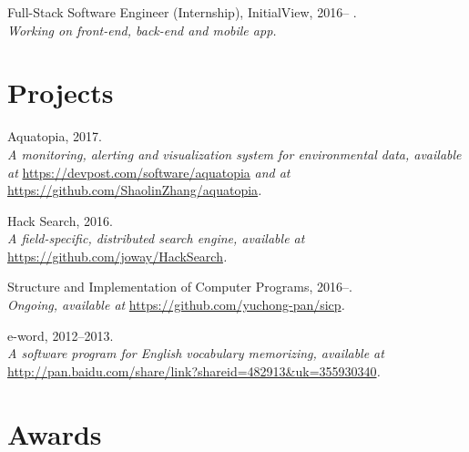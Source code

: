 \documentclass[letterpaper]{article}
\renewenvironment{itemize}{
  \begin{list}{}{
    \setlength{\leftmargin}{1.5em}
  }
}{
  \end{list}
}
\begin{document}
\begin{itemize}
  \item Full-Stack Software Engineer (Internship), InitialView, 2016-- .\\
  \emph{Working on front-end, back-end and mobile app.}
\end{itemize}


\section*{Projects}

\begin{itemize}
  \item Aquatopia, 2017.\\
  \emph{A monitoring, alerting and visualization system for environmental data, available at }\url{https://devpost.com/software/aquatopia}\emph{ and at }\url{https://github.com/ShaolinZhang/aquatopia}\emph{.}

  \item Hack Search, 2016.\\
  \emph{A field-specific, distributed search engine, available at }\url{https://github.com/joway/HackSearch}\emph{.}

  \item Structure and Implementation of Computer Programs, 2016--.\\
  \emph{Ongoing, available at }\url{https://github.com/yuchong-pan/sicp}\emph{.}

  \item e-word, 2012--2013.\\
  \emph{A software program for English vocabulary memorizing, available at }\url{http://pan.baidu.com/share/link?shareid=482913&uk=355930340}\emph{.}

\end{itemize}


\section*{Awards}
\end{document}

